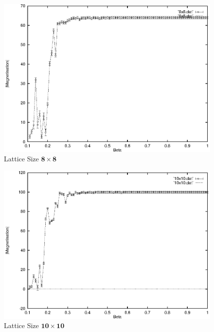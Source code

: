 \documentclass[a4paper]{IEEEtran}
\begin{document}
    \begin{figure}
    \caption{Lattice Size $\mathbf{8 \times 8}$}
    \label{fig:8x8-1} 
    \begin{center}
        \includegraphics[width=0.99\columnwidth]{8x8_1.eps}
    \end{center}
    \end{figure} 

    \begin{figure} 
    \caption{Lattice Size $\mathbf{10 \times 10}$}
    \label{fig:10x10-1} 
    \begin{center}
        \includegraphics[width=0.99\columnwidth]{10x10_1.eps}
    \end{center}
    \end{figure} 
\end{document}
